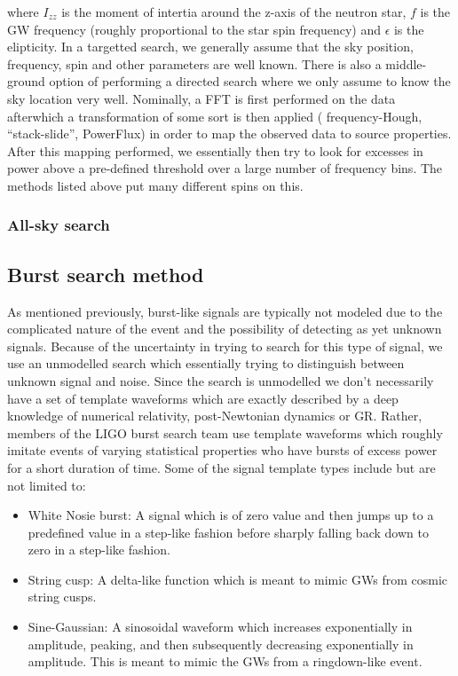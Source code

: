 where $I_{zz}$ is the moment of intertia around the z-axis of the 
neutron star, $f$ is the \ac{GW} frequency (roughly proportional to 
the star spin frequency) and $\epsilon$ is the elipticity. In a targetted 
search, we generally assume that the sky position, frequency, spin and 
other parameters are well known. There is also a middle-ground option of 
performing a directed search where we only assume to know the sky location 
very well. Nominally, a \ac{FFT} is first performed on the 
data afterwhich a transformation of some sort is then applied (
frequency-Hough, ``stack-slide'', PowerFlux) in order to 
map the observed data to source properties. After this mapping performed, 
we essentially then try to look for excesses in power above 
a pre-defined threshold over a large number of frequency bins. The 
methods listed above put many different spins on this\cite{PhysRevD.90.042002}.

\subsubsection{All-sky search}

\subsection{Burst search method}

As mentioned previously, burst-like signals are typically not modeled due to the complicated nature of the event and the possibility of detecting as yet unknown signals. Because of the uncertainty in trying to search for this type of signal, we use an unmodelled search which essentially trying to distinguish between unknown signal and noise. Since the search is unmodelled we don't necessarily have a set of template waveforms which are exactly described by a deep knowledge of numerical relativity, post-Newtonian dynamics or \ac{GR}. Rather, members of the \ac{LIGO} burst search team use template waveforms which roughly imitate events of varying statistical properties who have bursts of excess power for a short duration of time. Some of the signal template types include but are not limited to:

\begin{itemize}
    \item White Nosie burst: A signal which is of zero value and then jumps up to a predefined value in a step-like fashion before sharply falling back down to zero in a step-like fashion.
    \item String cusp: A delta-like function which is meant to mimic \ac{GW}s from cosmic string cusps.
    \item Sine-Gaussian: A sinosoidal waveform which increases exponentially in amplitude, peaking, and then subsequently decreasing exponentially in amplitude. This is meant to mimic the \ac{GW}s from a ringdown-like event.
\end{itemize}

